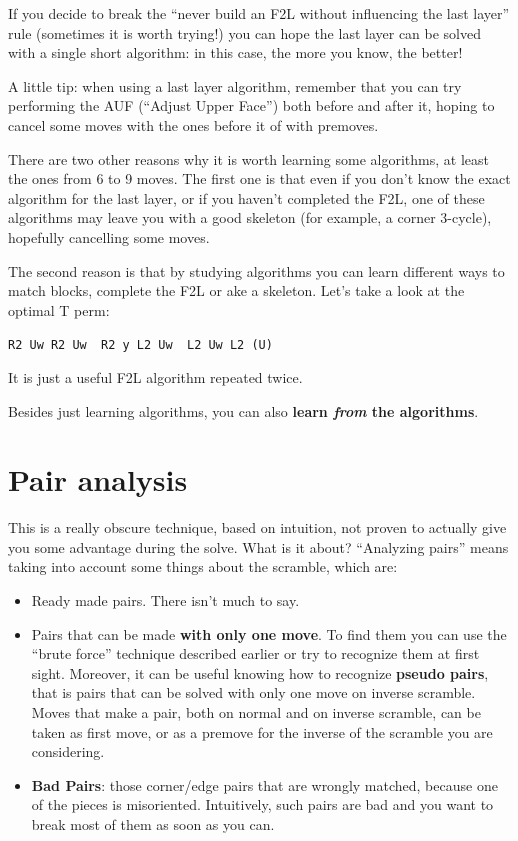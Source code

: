 \documentclass[11pt,a4paper]{book}
\newcommand{\p}{\textquotesingle}
\newcommand{\m}{\texttt}
\newcommand{\ps}{\p\,\,}
\begin{document}
If you decide to break the ``never build an F2L without influencing the last layer'' rule (sometimes it is worth trying!) you can hope the last layer can be solved with a single short algorithm: in this case, the more you know, the better!

A little tip: when using a last layer algorithm, remember that you can try performing the AUF (``Adjust Upper Face'') both before and after it, hoping to cancel some moves with the ones before it of with premoves.

There are two other reasons why it is worth learning some algorithms, at least the ones from 6 to 9 moves. The first one is that even if you don't know the exact algorithm for the last layer, or if you haven't completed the F2L, one of these algorithms may leave you with a good skeleton (for example, a corner 3-cycle), hopefully cancelling some moves.

The second reason is that by studying algorithms you can learn different ways to match blocks, complete the F2L or ake a skeleton. Let's take a look at the optimal T perm:

\begin{center}
\m{R2 Uw R2 Uw\ps R2 y L2 Uw\ps L2 Uw L2 (U\p)}
\end{center}

It is just a useful F2L algorithm repeated twice.

Besides just learning algorithms, you can also \textbf{learn \emph{from} the algorithms}.

\section{Pair analysis}

This is a really obscure technique, based on intuition, not proven to actually give you some advantage during the solve. What is it about? ``Analyzing pairs'' means taking into account some things about the scramble, which are:

\begin{itemize}
\item Ready made pairs. There isn't much to say.
\item Pairs that can be made \textbf{with only one move}. To find them you can use the ``brute force'' technique described earlier or try to recognize them at first sight. Moreover, it can be useful knowing how to recognize \textbf{pseudo pairs}, that is pairs that can be solved with only one move on inverse scramble. Moves that make a pair, both on normal and on inverse scramble, can be taken as first move, or as a premove for the inverse of the scramble you are considering.
\item \textbf{Bad Pairs}: those corner/edge pairs that are wrongly matched, because one of the pieces is misoriented. Intuitively, such pairs are bad and you want to break most of them as soon as you can.
\end{itemize}
\end{document}
